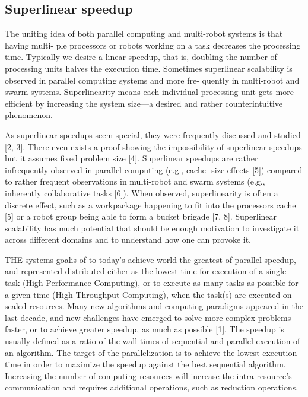 \subsection{Superlinear speedup}
\label{sec:backgound-superlinear}

The uniting idea of both parallel computing and multi-robot systems is that having multi-
ple processors or robots working on a task decreases the processing time. Typically we desire
a linear speedup, that is, doubling the number of processing units halves the execution time.
Sometimes superlinear scalability is observed in parallel computing systems and more fre-
quently in multi-robot and swarm systems. Superlinearity means each individual processing
unit gets more efficient by increasing the system size—a desired and rather counterintuitive
phenomenon.

As superlinear speedups seem special, they were frequently discussed and studied [2, 3]. There
even exists a proof showing the impossibility of superlinear speedups but it assumes fixed problem
size [4]. Superlinear speedups are rather infrequently observed in parallel computing (e.g., cache-
size effects [5]) compared to rather frequent observations in multi-robot and swarm systems (e.g.,
inherently collaborative tasks [6]). When observed, superlinearity is often a discrete effect, such
as a workpackage happening to fit into the processors cache [5] or a robot group being able to
form a bucket brigade [7, 8]. Superlinear scalability has much potential that should be enough
motivation to investigate it across different domains and to understand how one can provoke it.


THE systems goalis of to today’s achieve world the greatest of parallel speedup, and represented
distributed either as the lowest time for execution of a single task (High Performance Computing),
or to execute as many tasks as possible for a given time (High Throughput Computing), when the
task(s) are executed on scaled resources. Many new algorithms and computing paradigms appeared in
the last decade, and new challenges have emerged to solve more complex problems faster, or to
achieve greater speedup, as much as possible [1].  The speedup is usually defined as a ratio of the
wall times of sequential and parallel execution of an algorithm. The target of the parallelization
is to achieve the lowest execution time in order to maximize the speedup against the best
sequential algorithm. Increasing the number of computing resources will increase the
intra-resource’s communication and requires additional operations, such as reduction operations.


